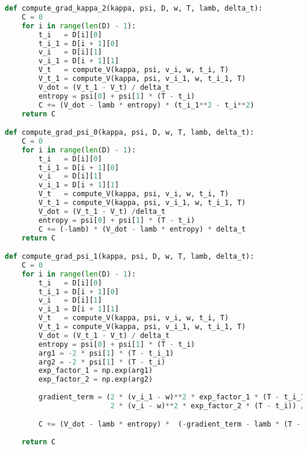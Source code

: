 \documentclass[oneside, a4paper, onecolumn, 11pt]{article}
\begin{document}
\begin{lstlisting}[language=Python, caption=EMV Portfolio Selection Algorithm, label=code:emv]
def compute_grad_kappa_2(kappa, psi, D, w, T, lamb, delta_t):
    C = 0 
    for i in range(len(D) - 1):
        t_i   = D[i][0]
        t_i_1 = D[i + 1][0]
        v_i   = D[i][1]
        v_i_1 = D[i + 1][1]
        V_t   = compute_V(kappa, psi, v_i, w, t_i, T)
        V_t_1 = compute_V(kappa, psi, v_i_1, w, t_i_1, T)
        V_dot = (V_t_1 - V_t) / delta_t 
        entropy = psi[0] + psi[1] * (T - t_i)
        C += (V_dot - lamb * entropy) * (t_i_1**2 - t_i**2)
    return C

def compute_grad_psi_0(kappa, psi, D, w, T, lamb, delta_t):
    C = 0 
    for i in range(len(D) - 1):
        t_i   = D[i][0]
        t_i_1 = D[i + 1][0]
        v_i   = D[i][1]
        v_i_1 = D[i + 1][1]
        V_t   = compute_V(kappa, psi, v_i, w, t_i, T)
        V_t_1 = compute_V(kappa, psi, v_i_1, w, t_i_1, T)
        V_dot = (V_t_1 - V_t) /delta_t
        entropy = psi[0] + psi[1] * (T - t_i)
        C += (-lamb) * (V_dot - lamb * entropy) * delta_t
    return C

def compute_grad_psi_1(kappa, psi, D, w, T, lamb, delta_t):
    C = 0 
    for i in range(len(D) - 1):
        t_i   = D[i][0]
        t_i_1 = D[i + 1][0]
        v_i   = D[i][1]
        v_i_1 = D[i + 1][1]
        V_t   = compute_V(kappa, psi, v_i, w, t_i, T)
        V_t_1 = compute_V(kappa, psi, v_i_1, w, t_i_1, T)
        V_dot = (V_t_1 - V_t) / delta_t  
        entropy = psi[0] + psi[1] * (T - t_i)
        arg1 = -2 * psi[1] * (T - t_i_1)
        arg2 = -2 * psi[1] * (T - t_i)
        exp_factor_1 = np.exp(arg1)
        exp_factor_2 = np.exp(arg2)
        
        gradient_term = (2 * (v_i_1 - w)**2 * exp_factor_1 * (T - t_i_1) -
                         2 * (v_i - w)**2 * exp_factor_2 * (T - t_i)) / delta_t

        C += (V_dot - lamb * entropy) *  (-gradient_term - lamb * (T - t_i)) * delta_t 
    
    return C
\end{lstlisting}
\label{sec:appendix}
\end{document}

